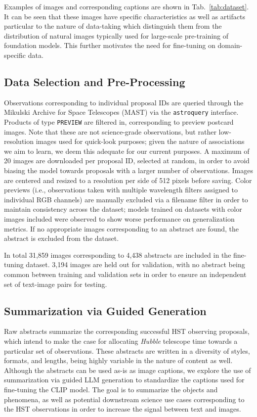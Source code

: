\documentclass[10pt]{article} %
\newcommand{\hubble}{\emph{Hubble}\xspace}
\begin{document}
Examples of images and corresponding captions are shown in Tab.~\ref{tab:dataset}. It can be seen that these images have specific characteristics as well as artifacts particular to the nature of data-taking which distinguish them from the distribution of natural images typically used for large-scale pre-training of foundation models. This further motivates the need for fine-tuning on domain-specific data.

\subsection{Data Selection and Pre-Processing}

Observations corresponding to individual proposal IDs are queried through the Mikulski Archive for Space Telescopes (MAST) via the \texttt{astroquery} interface. Products of type \texttt{PREVIEW} are filtered in, corresponding to preview postcard images. Note that these are not science-grade observations, but rather low-resolution images used for quick-look purposes; given the nature of associations we aim to learn, we deem this adequate for our current purposes. A maximum of 20 images are downloaded per proposal ID, selected at random, in order to avoid biasing the model towards proposals with a larger number of observations. Images are centered and resized to a resolution per side of 512 pixels before saving. Color previews (i.e., observations taken with multiple wavelength filters assigned to individual RGB channels) are manually excluded via a filename filter in order to maintain consistency across the dataset; models trained on datasets with color images included were observed to show worse performance on generalization metrics. If no appropriate images corresponding to an abstract are found, the abstract is excluded from the dataset.

In total 31,859 images corresponding to 4,438 abstracts are included in the fine-tuning dataset. 3,194 images are held out for validation, with no abstract being common between training and validation sets in order to ensure an independent set of text-image pairs for testing.


\subsection{Summarization via Guided Generation}
\label{sec:summarization}

Raw abstracts summarize the corresponding successful HST observing proposals, which intend to make the case for allocating \hubble telescope time towards a particular set of observations. These abstracts are written in a diversity of styles, formats, and lengths, being highly variable in the nature of content as well. Although the abstracts can be used as-is as image captions, we explore the use of summarization via guided LLM generation to standardize the captions used for fine-tuning the CLIP model. The goal is to summarize the objects and phenomena, as well as potential downstream science use cases corresponding to the HST observations in order to increase the signal between text and images.
\end{document}
